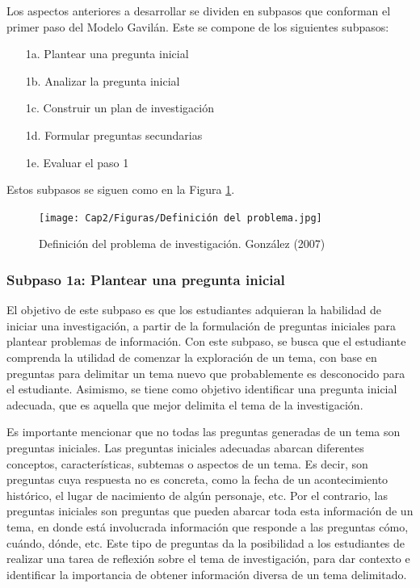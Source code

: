 Los aspectos anteriores a desarrollar se dividen en subpasos que conforman el primer paso del Modelo Gavilán. Este se compone de los siguientes subpasos:

\begin{itemize}
  \item [1a.] Plantear una pregunta inicial
  \item [1b.] Analizar la pregunta inicial
  \item [1c.] Construir un plan de investigación
  \item [1d.] Formular preguntas secundarias
  \item [1e.] Evaluar el paso 1
\end{itemize}

Estos subpasos se siguen como en la Figura \ref{fig:23}.

\begin{figure}[H]
  \centering
  \texttt{[image: Cap2/Figuras/Definición del problema.jpg]}
  \caption{Definición del problema de investigación. González (2007)}
  \label{fig:23}
\end{figure}


\subsubsection{Subpaso 1a: Plantear una pregunta inicial}
\label{secPaso1aCap2}

El objetivo de este subpaso es que los estudiantes adquieran la habilidad de iniciar una investigación, a partir de la formulación de preguntas iniciales para plantear problemas de información. Con este subpaso, se busca que el estudiante comprenda la utilidad de comenzar la exploración de un tema, con base en preguntas para delimitar un tema nuevo que probablemente es desconocido para el estudiante. Asimismo, se tiene como objetivo identificar una pregunta inicial adecuada, que es aquella que mejor delimita el tema de la investigación.

Es importante mencionar que no todas las preguntas generadas de un tema son preguntas iniciales. Las preguntas iniciales adecuadas abarcan diferentes conceptos, características, subtemas o aspectos de un tema. Es decir, son preguntas cuya respuesta no es concreta, como la fecha de un acontecimiento histórico, el lugar de nacimiento de algún personaje, etc. Por el contrario, las preguntas iniciales son preguntas que pueden abarcar toda esta información de un tema, en donde está involucrada información que responde a las preguntas cómo, cuándo, dónde, etc. Este tipo de preguntas da la posibilidad a los estudiantes de realizar una tarea de reflexión sobre el tema de investigación, para dar contexto e identificar la importancia de obtener información diversa de un tema delimitado.

